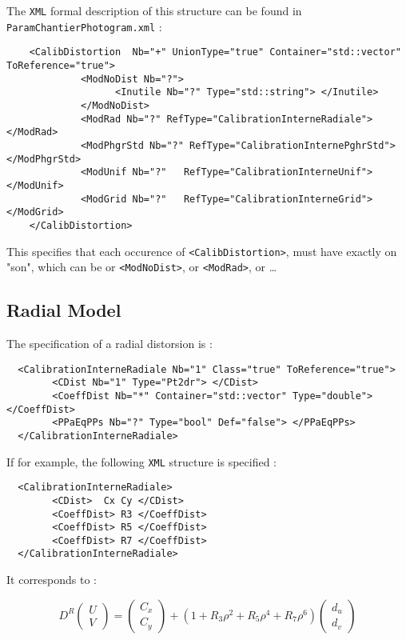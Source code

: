 The {\tt XML} formal description of this structure can be found in 
{\tt ParamChantierPhotogram.xml} :



\begin{verbatim}
    <CalibDistortion  Nb="+" UnionType="true" Container="std::vector" ToReference="true">
             <ModNoDist Nb="?">
                   <Inutile Nb="?" Type="std::string"> </Inutile>
             </ModNoDist>
             <ModRad Nb="?" RefType="CalibrationInterneRadiale">     </ModRad>
             <ModPhgrStd Nb="?" RefType="CalibrationInternePghrStd"> </ModPhgrStd>
             <ModUnif Nb="?"   RefType="CalibrationInterneUnif">    </ModUnif>
             <ModGrid Nb="?"   RefType="CalibrationInterneGrid">    </ModGrid>
    </CalibDistortion>
\end{verbatim}


This specifies that each  occurence of {\tt <CalibDistortion>}, must have exactly on "son", which can be
or {\tt <ModNoDist>}, or {\tt <ModRad>}, or \dots


\subsection{Radial Model}

\label{SpGeo:Rad}

The specification of a radial distorsion is  :


\begin{verbatim}
  <CalibrationInterneRadiale Nb="1" Class="true" ToReference="true">
        <CDist Nb="1" Type="Pt2dr"> </CDist>
        <CoeffDist Nb="*" Container="std::vector" Type="double"> </CoeffDist>
        <PPaEqPPs Nb="?" Type="bool" Def="false"> </PPaEqPPs>
  </CalibrationInterneRadiale>
\end{verbatim}

If for example, the following {\tt XML} structure is specified :

\begin{verbatim}
  <CalibrationInterneRadiale>
        <CDist>  Cx Cy </CDist>
        <CoeffDist> R3 </CoeffDist>
        <CoeffDist> R5 </CoeffDist>
        <CoeffDist> R7 </CoeffDist>
  </CalibrationInterneRadiale>
\end{verbatim}

It corresponds to :

\begin{equation}
   D^R\begin{pmatrix} U \\ V \end{pmatrix}
   =   \begin{pmatrix} C_x \\ C_y \end{pmatrix}
     + (1+R_3 \rho^2 + R_5 \rho^4 +  R_7 \rho^6  )\begin{pmatrix} d_u \\ d_v \end{pmatrix}
\end{equation}

